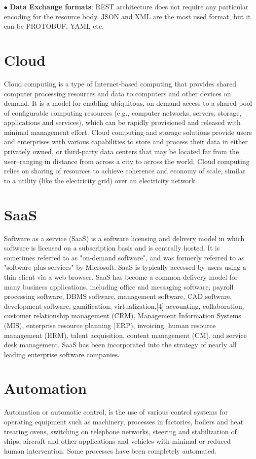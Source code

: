 $\bullet$ \textbf{Data Exchange formats}: REST architecture does not require any particular
encoding for the resource body. JSON and XML are the most used format, but it
can be PROTOBUF, YAML etc. 

\section{Cloud}

Cloud computing is a type of Internet-based computing that provides shared
computer processing resources and data to computers and other devices on demand.
It is a model for enabling ubiquitous, on-demand access to a shared pool of
configurable computing resources (e.g., computer networks, servers, storage,
applications and services), which can be rapidly provisioned and released
with minimal management effort. Cloud computing and storage solutions provide
users and enterprises with various capabilities to store and process their data
in either privately owned, or third-party data centers that may be located
far from the user–ranging in distance from across a city to across the world.
Cloud computing relies on sharing of resources to achieve coherence and economy
of scale, similar to a utility (like the electricity grid) over an electricity
network.

\section{SaaS}
Software as a service (SaaS) is a software licensing and
delivery model in which software is licensed on a subscription basis and is
centrally hosted. It is sometimes referred to as "on-demand software",
and was formerly referred to as "software plus services" by Microsoft. SaaS
is typically accessed by users using a thin client via a web browser. SaaS has
become a common delivery model for many business applications, including office
and messaging software, payroll processing software, DBMS software, management
software, CAD software, development software, gamification, virtualization,[4]
accounting, collaboration, customer relationship management (CRM), Management
Information Systems (MIS), enterprise resource planning (ERP), invoicing, human
resource management (HRM), talent acquisition, content management (CM), and
service desk management. SaaS has been incorporated into the strategy of
nearly all leading enterprise software companies.

\section{Automation}
Automation or automatic control, is the use of various control systems for
operating equipment such as machinery, processes in factories, boilers and heat
treating ovens, switching on telephone networks, steering and stabilization of
ships, aircraft and other applications and vehicles with minimal or reduced
human intervention. Some processes have been completely automated.


